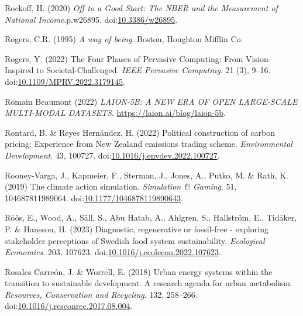 \documentclass[
  letterpaper,
  DIV=11,
  numbers=noendperiod]{scrartcl}
\newlength{\cslhangindent}
\newenvironment{CSLReferences}[2] %
 {\begin{list}{}{%
  \setlength{\itemindent}{0pt}
  \setlength{\leftmargin}{0pt}
  \setlength{\parsep}{0pt}
  \ifodd #1
   \setlength{\leftmargin}{\cslhangindent}
   \setlength{\itemindent}{-1\cslhangindent}
  \fi
  \setlength{\itemsep}{#2\baselineskip}}}
 {\end{list}}
\begin{document}
\begin{CSLReferences}{0}{1}
Rockoff, H. (2020) \emph{Off to a {Good Start}: {The NBER} and the
{Measurement} of {National Income}}.p.w26895.
doi:\href{https://doi.org/10.3386/w26895}{10.3386/w26895}.

Rogers, C.R. (1995) \emph{A way of being}. Boston, Houghton Mifflin Co.

Rogers, Y. (2022) The {Four Phases} of {Pervasive Computing}: {From
Vision-Inspired} to {Societal-Challenged}. \emph{IEEE Pervasive
Computing}. 21 (3), 9--16.
doi:\href{https://doi.org/10.1109/MPRV.2022.3179145}{10.1109/MPRV.2022.3179145}.

Romain Beaumont (2022) \emph{{LAION-5B}: {A NEW ERA OF OPEN LARGE-SCALE
MULTI-MODAL DATASETS}}. \url{https://laion.ai/blog/laion-5b}.

Rontard, B. \& Reyes Hernández, H. (2022) Political construction of
carbon pricing: {Experience} from {New Zealand} emissions trading
scheme. \emph{Environmental Development}. 43, 100727.
doi:\href{https://doi.org/10.1016/j.envdev.2022.100727}{10.1016/j.envdev.2022.100727}.

Rooney-Varga, J., Kapmeier, F., Sterman, J., Jones, A., Putko, M. \&
Rath, K. (2019) The climate action simulation. \emph{Simulation \&
Gaming}. 51, 104687811989064.
doi:\href{https://doi.org/10.1177/1046878119890643}{10.1177/1046878119890643}.

Röös, E., Wood, A., Säll, S., Abu Hatab, A., Ahlgren, S., Hallström, E.,
Tidåker, P. \& Hansson, H. (2023) Diagnostic, regenerative or
fossil-free - exploring stakeholder perceptions of {Swedish} food system
sustainability. \emph{Ecological Economics}. 203, 107623.
doi:\href{https://doi.org/10.1016/j.ecolecon.2022.107623}{10.1016/j.ecolecon.2022.107623}.

Rosales Carreón, J. \& Worrell, E. (2018) Urban energy systems within
the transition to sustainable development. {A} research agenda for urban
metabolism. \emph{Resources, Conservation and Recycling}. 132, 258--266.
doi:\href{https://doi.org/10.1016/j.resconrec.2017.08.004}{10.1016/j.resconrec.2017.08.004}.


\end{CSLReferences}
\end{document}
